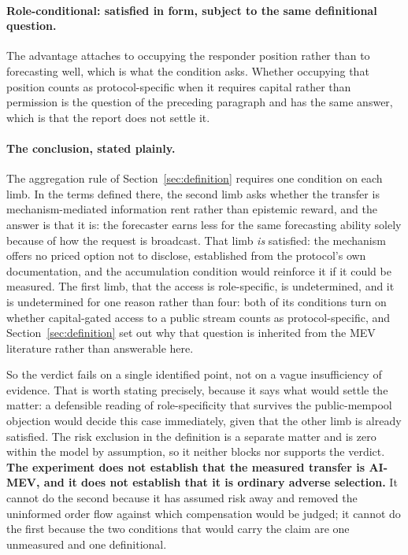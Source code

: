 \paragraph{Role-conditional: satisfied in form, subject to the same definitional question.}
The advantage attaches to occupying the responder position rather than to forecasting well,
which is what the condition asks. Whether occupying that position counts as protocol-specific
when it requires capital rather than permission is the question of the preceding paragraph
and has the same answer, which is that the report does not settle it.

\paragraph{The conclusion, stated plainly.} The aggregation rule of
Section~\ref{sec:definition} requires one condition on each limb. In the terms defined
there, the second limb asks whether the transfer is mechanism-mediated information rent
rather than epistemic reward, and the answer is that it is: the forecaster earns less for
the same forecasting ability solely because of how the request is broadcast. That limb
\emph{is} satisfied: the mechanism offers no priced
option not to disclose, established from the protocol's own documentation, and the
accumulation condition would reinforce it if it could be measured. The first limb, that the
access is role-specific, is undetermined, and it is undetermined for one reason rather than
four: both of its conditions turn on whether capital-gated access to a public stream counts
as protocol-specific, and Section~\ref{sec:definition} set out why that question is
inherited from the MEV literature rather than answerable here.

So the verdict fails on a single identified point, not on a vague insufficiency of evidence.
That is worth stating precisely, because it says what would settle the matter: a defensible
reading of role-specificity that survives the public-mempool objection would decide this
case immediately, given that the other limb is already satisfied. The risk exclusion in the
definition is a separate matter and is zero within the model by assumption, so it neither
blocks nor supports the verdict. \textbf{The experiment does not establish that the measured transfer is AI-MEV, and it does
not establish that it is ordinary adverse selection.} It cannot do the second because it has assumed risk away and removed the
uninformed order flow against which compensation would be judged; it cannot do the first
because the two conditions that would carry the claim are one unmeasured and one definitional.

